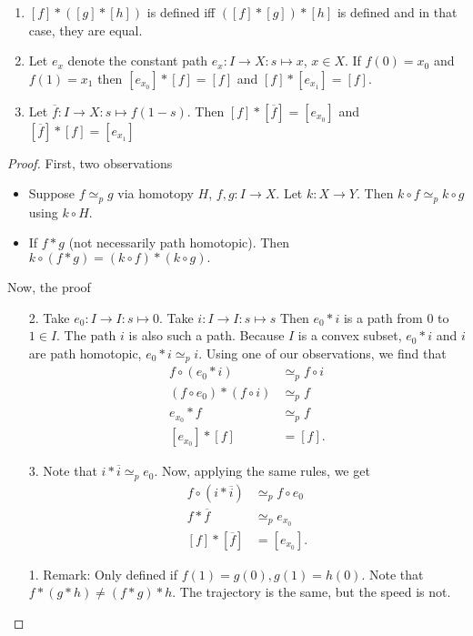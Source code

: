 \begin{theorem}\leavevmode
    \begin{enumerate}
        \item $[f] * ([g] * [h])$  is defined iff $([f] * [g])*[h]$ is defined and in that case, they are equal.
        \item Let $e_x$ denote the constant path $e_x: I \to  X: s \mapsto x$, $x \in X$. If $f(0) = x_0$ and $f(1) = x_1$ then $[e_{x_0}] * [f] = [f]$ and $[f] * [e_{x_1}] = [f]$.
        \item Let $\overline{f} : I \to  X: s \mapsto  f(1-s)$. Then $[f] * [\overline{f}] = [e_{x_0}]$ and $[\overline{f}]*[f] = [e_{x_1}]$
    \end{enumerate}
\end{theorem}
\begin{proof}
    First, two observations
    \begin{itemize}
        \item Suppose $f\simeq_p g$ via homotopy $H$, $f, g: I\to X$.
            Let $k: X \to  Y$.
            Then $k  \circ  f \simeq_p k \circ g$ using $k  \circ H$.
        \item If $f*g$ (not necessarily path homotopic). Then $ k  \circ (f*g) = (k \circ f) * (k \circ g) .$ 
    \end{itemize}

    Now, the proof
    \begin{itemize}
        \item[2.]  Take $e_0: I \to  I: s \mapsto 0$.
            Take $i: I \to  I: s \mapsto s$ 
            Then $e_0*i$ is a path from $0$ to $1 \in I$.
            The path $i$ is also such a path.
            Because $I$ is a convex subset, $e_0*i$ and $i$ are path homotopic, $e_0 *i\simeq_p i$.
            Using one of our observations, we find that
            \begin{align*}
                f  \circ (e_0 * i) &\simeq_p  f  \circ i\\
                (f  \circ  e_0) * (f  \circ  i ) &\simeq_p f\\
                e_{x_0} * f  &\simeq_p f\\
                [e_{x_0}] * [f]  &= [f]
            .\end{align*}

        \item [3.] Note that $i * \overline{i} \simeq_p e_0$.
            Now, applying the same rules, we get 
            \begin{align*}
                f  \circ (i * \overline{i}) &\simeq_p f  \circ  e_0\\
                f * \overline{f} &\simeq_p  e_{x_0}\\
                [f] * [\overline{f}] & = [e_{x_0}]
            .\end{align*}
        \item[1.]  Remark: Only defined if $f(1) = g(0), g(1) = h(0)$.
            Note that $f*(g*h) \neq (f*g)*h$. The trajectory is the same, but the speed is not.


\end{itemize}
\end{proof}
